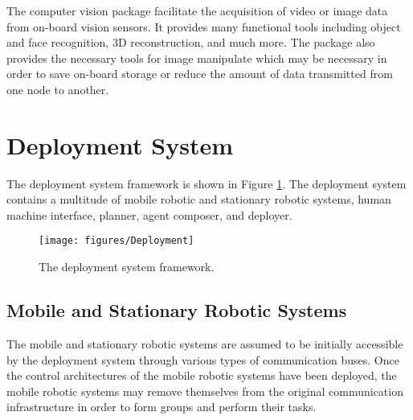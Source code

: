     The computer vision package facilitate the acquisition of video or image 
      data from on-board vision sensors.
    It provides many functional tools including object and face recognition,
      3D reconstruction, and much more.
    The package also provides the necessary tools for image manipulate which may
      be necessary in order to save on-board storage or reduce the amount of
      data transmitted from one node to another. 


  \section{Deployment System} \label{sec:ds}
    The deployment system framework is shown in Figure \ref{fig:deploy_arch}.
    The deployment system contains a multitude of mobile robotic and stationary 
      robotic systems, human machine interface, planner, agent composer, and 
      deployer.

    \begin{figure}%
      \centerline{\texttt{[image: figures/Deployment]}}
      \caption{The deployment system framework.}
      \label{fig:deploy_arch}
    \end{figure}

    \subsection{Mobile and Stationary Robotic Systems}
      The mobile and stationary robotic systems are assumed to 
        be initially accessible by the deployment system through
        various types of communication buses.
      Once the control architectures of the mobile robotic systems have 
        been deployed, the mobile robotic systems may remove themselves 
        from the original communication infrastructure in order to
        form groups and perform their tasks.

